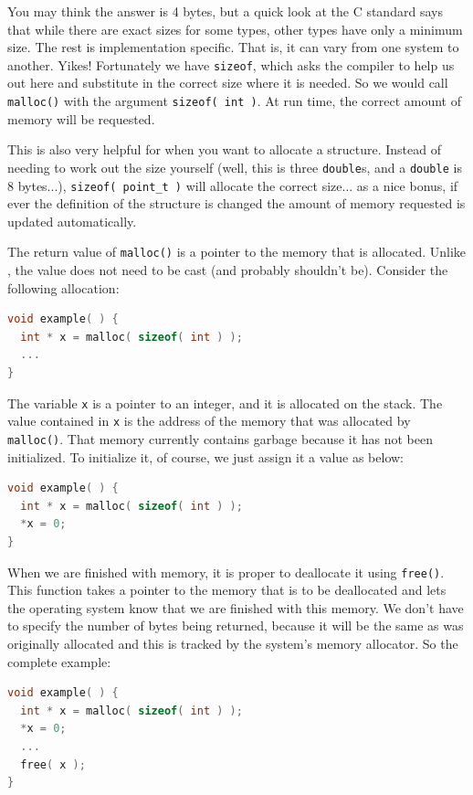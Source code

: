You may think the answer is 4 bytes, but a quick look at the C standard says that while there are exact sizes for some types, other types have only a minimum size. The rest is implementation specific. That is, it can vary from one system to another. Yikes! Fortunately we have \texttt{sizeof}, which asks the compiler to help us out here and substitute in the correct size where it is needed. So we would call \texttt{malloc()} with the argument \texttt{sizeof( int )}. At run time, the correct amount of memory will be requested.

This is also very helpful for when you want to allocate a structure. Instead of needing to work out the size yourself (well, this is three \texttt{double}s, and a \texttt{double} is 8 bytes...), \texttt{sizeof( point\_t )} will allocate the correct size... as a nice bonus, if ever the definition of the structure is changed the amount of memory requested is updated automatically.

The return value of \texttt{malloc()} is a pointer to the memory that is allocated. Unlike \Cpp, the value does not need to be cast (and probably shouldn't be).
Consider the following allocation:

\begin{lstlisting}[language=C]
void example( ) {
  int * x = malloc( sizeof( int ) );
  ...
}
\end{lstlisting}

The variable \texttt{x} is a pointer to an integer, and it is allocated on the stack. The value contained in \texttt{x} is the address of the memory that was allocated by \texttt{malloc()}. That memory currently contains garbage because it has not been initialized. To initialize it, of course, we just assign it a value as below:

\begin{lstlisting}[language=C]
void example( ) {
  int * x = malloc( sizeof( int ) );
  *x = 0;
}
\end{lstlisting}

When we are finished with memory, it is proper to deallocate it using \texttt{free()}. This function takes a pointer to the memory that is to be deallocated and lets the operating system know that we are finished with this memory. We don't have to specify the number of bytes being returned, because it will be the same as was originally allocated and this is tracked by the system's memory allocator. So the complete example:

\begin{lstlisting}[language=C]
void example( ) {
  int * x = malloc( sizeof( int ) );
  *x = 0;
  ...
  free( x );
}
\end{lstlisting}


